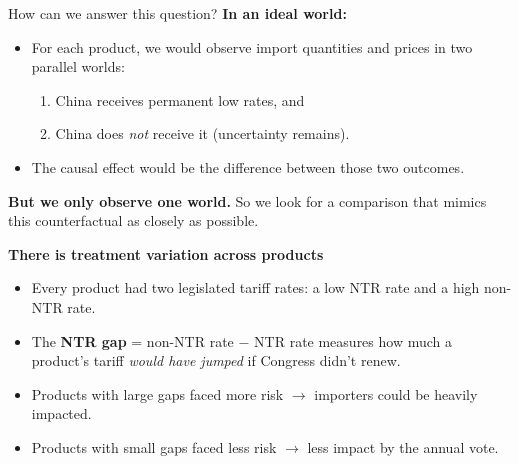 \documentclass[aspectratio=169]{beamer}
\begin{document}
\begin{frame}{How can we answer this question?}
  \small
  \textbf{In an ideal world:}
  \begin{itemize}
    \item For each product, we would observe import quantities and prices in two parallel worlds:
          \begin{enumerate}
            \item China receives permanent low rates, and
            \item China does \emph{not} receive it (uncertainty remains).
          \end{enumerate}
    \item The causal effect would be the difference between those two outcomes.
  \end{itemize}

  \vspace{0.3cm}
  \textbf{But we only observe one world.}
  So we look for a comparison that mimics this counterfactual as closely as possible.
  \vspace{0.3cm}

  \textbf{There is treatment variation across products}
  \begin{itemize}
    \item Every product had two legislated tariff rates: a low NTR rate and a high non-NTR rate.
    \item The \textbf{NTR gap} = non-NTR rate $-$ NTR rate measures how much a product's tariff \emph{would have jumped} if Congress didn't renew.
    \item Products with large gaps faced more risk $\rightarrow$ importers could be heavily impacted.
    \item Products with small gaps faced less risk $\rightarrow$ less impact by the annual vote.
  \end{itemize}
\end{frame}

\end{document}

